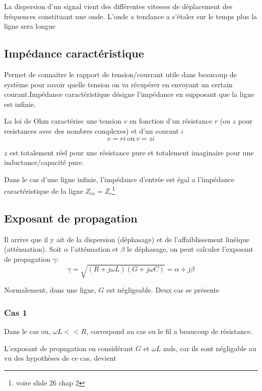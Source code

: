 \documentclass[12pt]{article}
\begin{document}
		La dispersion d'un signal vient des différentes vitesses de déplacement des fréquences constituant une onde. L'onde a tendance a s'étaler sur le temps plus la ligne sera longue
		
	\subsection{Impédance caractéristique}
		Permet de connaitre le rapport de tension/courrant utile dans beaucoup de système pour savoir quelle tension on va récupérer en envoyant un certain courant.Impédance caractéristique désigne l'impédance en supposant que la ligne est infinie.
		
		La loi de Ohm caractérise une tension $v$ en fonction d'un résistance $r$ (ou $z$ pour resistances avec des nombres complexes) et d'un courant $i$
		\begin{equation}
			v = ri\  \text{ou} \  v = zi
		\end{equation}
		
		$z$ est totalement réel pour une résistance pure et totalement imaginaire pour une inductance/capacité pure.
		
		Dans le cas d'une ligne infinie, l'impédance d'entrée est égal a l'impédance caractéristique de la ligne $Z_{in} = Z_c$\footnote{voire slide 26 chap 2}
		
	\subsection{Exposant de propagation}
		Il arrive que il y ait de la dispersion (déphasage) et de l'affaiblissement linéique (atténuation). Soit $\alpha$ l'atténuation et $\beta$ le déphasage, on peut calculer l'exposant de propagation $\gamma$:
		\begin{equation}
			\gamma = \sqrt{(R + j \omega L)(G + j \omega C)} = \alpha + j \beta
		\end{equation}
		
		Normalement, dans une ligne, $G$ est négligeable. Deux cas se présente 
		
		\subsubsection{Cas 1}
			Dans le cas ou, $\omega L << R$, correspond au cas ou le fil a beaucoup de résistance.
			
			L'exposant de propagation en considérant $G$ et $\omega L$ nuls, car ils sont négligable au vu des hypothèses de ce cas, devient
			
\end{document}
